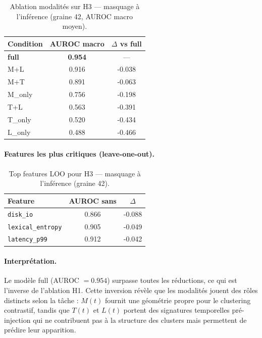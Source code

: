 \begin{table}[h]
\centering
\caption{Ablation modalités sur H3 --- masquage à l'inférence (graine 42, AUROC macro moyen).}
\label{tab:ablation_h3_modality}
\begin{tabular}{lcc}
\toprule
\textbf{Condition} & \textbf{AUROC macro} & \textbf{$\Delta$ vs full} \\
\midrule
\textbf{full}    & \textbf{0.954} & --- \\
M+L              & 0.916          & -0.038 \\
M+T              & 0.891          & -0.063 \\
M\_only          & 0.756          & -0.198 \\
T+L              & 0.563          & -0.391 \\
T\_only          & 0.520          & -0.434 \\
L\_only          & 0.488          & -0.466 \\
\bottomrule
\end{tabular}
\end{table}

\paragraph{Features les plus critiques (leave-one-out).}

\begin{table}[h]
\centering
\caption{Top features LOO pour H3 --- masquage à l'inférence (graine 42).}
\label{tab:ablation_h3_loo}
\begin{tabular}{lcc}
\toprule
\textbf{Feature} & \textbf{AUROC sans} & \textbf{$\Delta$} \\
\midrule
\texttt{disk\_io}          & 0.866 & -0.088 \\
\texttt{lexical\_entropy}  & 0.905 & -0.049 \\
\texttt{latency\_p99}      & 0.912 & -0.042 \\
\bottomrule
\end{tabular}
\end{table}

\paragraph{Interprétation.}
Le modèle full (AUROC $= 0.954$) surpasse toutes les réductions, ce qui est l'inverse
de l'ablation H1. Cette inversion révèle que les modalités jouent des rôles distincts
selon la tâche : $M(t)$ fournit une géométrie propre pour le clustering contrastif,
tandis que $T(t)$ et $L(t)$ portent des signatures temporelles pré-injection qui ne
contribuent pas à la structure des clusters mais permettent de prédire leur apparition.


